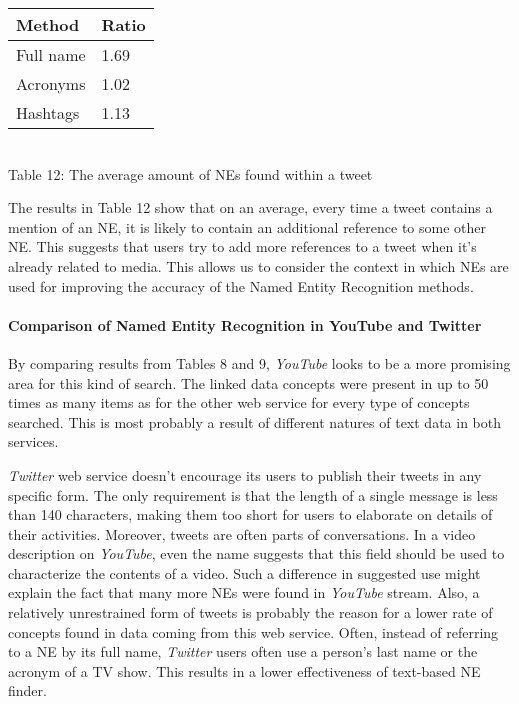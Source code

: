 \begin{center}
  \begin{tabular}{ | p{4cm} | p{2cm} | } \hline
    Method & Ratio \\ \hline
    Full name & 1.69 \\ \hline
    Acronyms & 1.02 \\ \hline
    Hashtags & 1.13 \\ \hline
  \end{tabular} \\
  Table 12: The average amount of NEs found within a tweet \\
\end{center}

The results in Table 12 show that on an average, every time a tweet contains a mention of an NE,
it is likely to contain an additional reference to some other NE. This suggests that users try to add
more references to a tweet when it's already related to media. This allows us to consider the context
in which NEs are used for improving the accuracy of the Named Entity Recognition methods.

\paragraph{Comparison of Named Entity Recognition in YouTube and Twitter}
By comparing results from Tables 8 and 9, \textit{YouTube} looks to be a more promising area for this
kind of search. The linked data concepts were present in up to 50 times as many items as for the other
web service for every type of concepts searched. This is most probably a result of different natures of
text data in both services.

\textit{Twitter} web service doesn't encourage its users to publish their tweets in any
specific form. The only requirement is that the length of a single message
is less than 140 characters, making them too short for users to elaborate
on details of their activities. Moreover, tweets are often parts of
conversations. In a video description on \textit{YouTube}, even the name
suggests that this field should be used to characterize the contents
of a video. Such a difference in suggested use might explain the fact that
many more NEs were found in \textit{YouTube} stream. Also, a relatively
unrestrained form of tweets is probably the reason for a lower rate of
concepts found in data coming from this web service. Often, instead of referring to
a NE by its full name, \textit{Twitter} users often use a person's
last name or the acronym of a TV show. This results in a lower effectiveness of
text-based NE finder.

